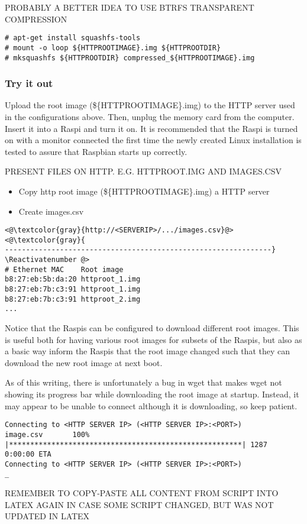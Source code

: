 PROBABLY A BETTER IDEA TO USE BTRFS TRANSPARENT COMPRESSION

\begin{lstlisting}[]
# apt-get install squashfs-tools
# mount -o loop ${HTTPROOTIMAGE}.img ${HTTPROOTDIR}
# mksquashfs ${HTTPROOTDIR} compressed_${HTTPROOTIMAGE}.img
\end{lstlisting}
\FloatBarrier
\vspace{-5mm}

\subsubsection{Try it out}

Upload the root image (\$\{HTTPROOTIMAGE\}.img) to the HTTP server used in the
configurations above. Then, unplug the memory card from the computer.
Insert it into a \ac{Raspi} and
turn it on. It is recommended that the \ac{Raspi} is turned on with a monitor
connected the first time the newly created Linux installation is tested to
assure that Raspbian starts up correctly.


PRESENT FILES ON HTTP. E.G. HTTPROOT.IMG AND IMAGES.CSV


\begin{itemize}
    \item Copy http root image (\$\{HTTPROOTIMAGE\}.img) a HTTP server
    \item Create images.csv
\end{itemize}


\Suppressnumber\begin{lstlisting}[]
<@\textcolor{gray}{http://<SERVERIP>/.../images.csv}@>
<@\textcolor{gray}{
---------------------------------------------------------------}
\Reactivatenumber @>
# Ethernet MAC    Root image
b8:27:eb:5b:da:20 httproot_1.img
b8:27:eb:7b:c3:91 httproot_1.img
b8:27:eb:7b:c3:91 httproot_2.img
...
\end{lstlisting}
\FloatBarrier
\vspace{-5mm}

Notice that the \ac{Raspi}s can be configured to download different root images.
This is useful both for having various root images for subsets of the \ac{Raspi}s,
but also as a basic way inform the \ac{Raspi}s that the root image changed such
that they can download the new root image at next boot.

As of this writing, there is unfortunately a bug in wget that makes wget not showing
its progress bar while downloading the root image at startup. Instead, it may appear
to be unable to connect although it is downloading, so keep patient.

\begin{lstlisting}[]
Connecting to <HTTP SERVER IP> (<HTTP SERVER IP>:<PORT>)
image.csv       100% |*******************************************************| 1287   0:00:00 ETA
Connecting to <HTTP SERVER IP> (<HTTP SERVER IP>:<PORT>)
_
\end{lstlisting}
\FloatBarrier
\vspace{-5mm}


REMEMBER TO COPY-PASTE ALL CONTENT FROM SCRIPT INTO LATEX AGAIN IN CASE SOME
SCRIPT CHANGED, BUT WAS NOT UPDATED IN LATEX
